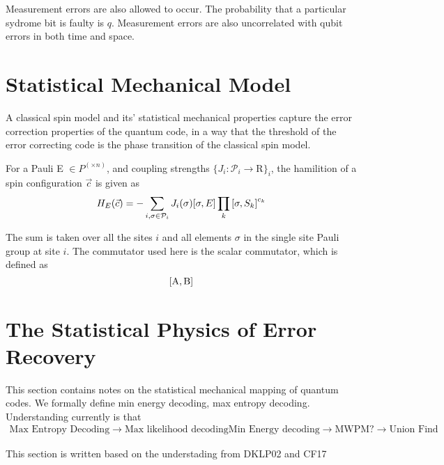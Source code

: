 Measurement errors are also allowed to occur. The probability that a particular sydrome bit is faulty is \(q\). Measurement errors are also uncorrelated with qubit errors in both time and space.




\section{Statistical Mechanical Model}\label{sec:sec1-name}

A classical spin model and its' statistical mechanical properties capture the error correction properties of the quantum code, in a way that the threshold of the error correcting code is the phase transition of the classical spin model.\cite{chubbflammia2021, dlkp2002}

\begin{definition}
    For a Pauli E \(\in P^(\times n)\), and coupling strengths \( \{ J_i: \mathcal{P}_i \rightarrow \mathrm{R} \}_i \), the hamilition of a spin configuration \( \vec{c}\) is given as 
    \[
        H_E(\vec{c}) = - \sum_{i, \sigma \in  \mathcal{P}_i} J_i(\sigma) \comm{\sigma}{E} \prod_{k} \comm{\sigma}{S_k}^{c_k}
    \]
\end{definition}
The sum is taken over all the sites \(i\) and all elements \( \sigma \) in the single site Pauli group at site \(i\). The commutator used here is the scalar commutator, which is defined as 
\begin{equation}
    \mathrm{\comm{A}{B}}
\end{equation}


\section*{The Statistical Physics of Error Recovery}
This section contains notes on the statistical mechanical mapping of quantum codes. We formally define min energy decoding, max entropy decoding. Understanding currently is that
\begin{align*}
    \text{Max Entropy Decoding} \rightarrow \text{Max likelihood decoding}
    \text{Min Energy decoding} \rightarrow \text{MWPM}
    \text{?} \rightarrow \text{Union Find}    
\end{align*}

This section is written based on the understading from DKLP02 and CF17